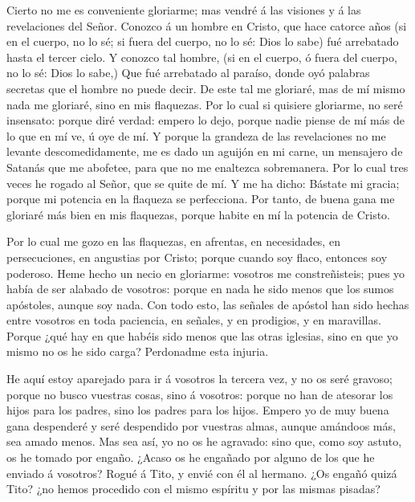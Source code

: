  Cierto no me es conveniente gloriarme; mas vendré á las
visiones y á las revelaciones del Señor.  Conozco á un
hombre en Cristo, que hace catorce años (si en el cuerpo, no lo sé; si
fuera del cuerpo, no lo sé: Dios lo sabe) fué arrebatado hasta el tercer
cielo.  Y conozco tal hombre, (si en el cuerpo, ó fuera del
cuerpo, no lo sé: Dios lo sabe,)  Que fué arrebatado al
paraíso, donde oyó palabras secretas que el hombre no puede decir.
 De este tal me gloriaré, mas de mí mismo nada me gloriaré,
sino en mis flaquezas.  Por lo cual si quisiere gloriarme,
no seré insensato: porque diré verdad: empero lo dejo, porque nadie
piense de mí más de lo que en mí ve, ú oye de mí.  Y porque
la grandeza de las revelaciones no me levante descomedidamente, me es
dado un aguijón en mi carne, un mensajero de Satanás que me abofetee,
para que no me enaltezca sobremanera.  Por lo cual tres
veces he rogado al Señor, que se quite de mí.  Y me ha
dicho: Bástate mi gracia; porque mi potencia en la flaqueza se
perfecciona. Por tanto, de buena gana me gloriaré más bien en mis
flaquezas, porque habite en mí la potencia de Cristo.

 Por lo cual me gozo en las flaquezas, en afrentas, en
necesidades, en persecuciones, en angustias por Cristo; porque cuando
soy flaco, entonces soy poderoso.  Heme hecho un necio en
gloriarme: vosotros me constreñisteis; pues yo había de ser alabado de
vosotros: porque en nada he sido menos que los sumos apóstoles, aunque
soy nada.  Con todo esto, las señales de apóstol han sido
hechas entre vosotros en toda paciencia, en señales, y en prodigios, y
en maravillas.  Porque ¿qué hay en que habéis sido menos
que las otras iglesias, sino en que yo mismo no os he sido carga?
Perdonadme esta injuria.

 He aquí estoy aparejado para ir á vosotros la tercera vez,
y no os seré gravoso; porque no busco vuestras cosas, sino á vosotros:
porque no han de atesorar los hijos para los padres, sino los padres
para los hijos.  Empero yo de muy buena gana despenderé y
seré despendido por vuestras almas, aunque amándoos más, sea amado
menos.  Mas sea así, yo no os he agravado: sino que, como
soy astuto, os he tomado por engaño.  ¿Acaso os he engañado
por alguno de los que he enviado á vosotros?  Rogué á Tito,
y envié con él al hermano. ¿Os engañó quizá Tito? ¿no hemos procedido
con el mismo espíritu y por las mismas pisadas?

